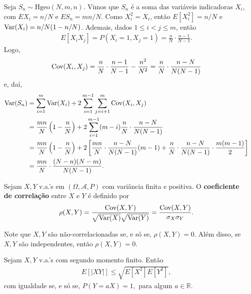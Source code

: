\documentclass[../Notas.tex]{subfiles}
\begin{document}
\begin{example}
Seja $S_n\sim\text{Hgeo}(N,m,n)$. Vimos que $S_n$ é a soma das variáveis indicadoras $X_i$, com $EX_i = n/N$ e $ES_n = mn/N$. Como $X_i^2=X_i$, então $E[X_i^2] = n/N$ e $\text{Var}(X_i) = n/N(1 - n/N)$. Ademais, dados $1\leq i < j\leq m$, então
\begin{align*}
    E[X_iX_j] = P(X_i = 1, X_j = 1) = \frac{n}{N}\cdot\frac{n-1}{N-1}.
\end{align*}
Logo,
\begin{align*}
    \text{Cov}(X_i, X_j) = \frac{n}{N}\cdot\frac{n-1}{N-1} - \frac{n^2}{N^2} = \frac{n}{N}\cdot\frac{n-N}{N(N-1)}
\end{align*}
e, daí,
\begin{align*}
    \text{Var}(S_n) &= \sum_{i=1}^m \text{Var}(X_i) + 2\sum_{i=1}^{m-1}\sum_{j=i+1}^m \text{Cov}(X_i, X_j) \\
    &= \frac{mn}{N}\left(1 - \frac{n}{N}\right) + 2\sum_{i=1}^{m-1}(m-i)\frac{n}{N}\cdot\frac{n-N}{N(N-1)} \\
    &= \frac{mn}{N}\left(1 - \frac{n}{N}\right) + 2\left[ \frac{mn}{N}\cdot\frac{n-N}{N(N-1)}(m-1) + \frac{n}{N}\cdot\frac{n-N}{N(N-1)}\cdot\frac{m(m-1)}{2} \right] \\
    &= \frac{mn}{N}\cdot\frac{(N-n)(N-m)}{N(N-1)}.
\end{align*}
\end{example}

\begin{definition}
Sejam $X,Y$ v.a.'s em $(\Omega, \mathcal{A}, P)$ com variância finita e positiva. O \textbf{coeficiente de correlação} entre $X$ e $Y$ é definido por
\begin{align*}
    \rho(X,Y) = \frac{\text{Cov}(X,Y)}{\sqrt{\text{Var}(X)}\sqrt{\text{Var}(Y)}} = \frac{\text{Cov}(X,Y)}{\sigma_X\sigma_Y}.
\end{align*}
\end{definition}

\begin{remark}
Note que $X, Y$ são não-correlacionadas se, e só se, $\rho(X,Y) = 0$. Além disso, se $X,Y$ são independentes, então $\rho(X,Y) = 0$.
\end{remark}

\begin{theorem}
Sejam $X,Y$ v.a.'s com segundo momento finito. Então
\begin{align*}
    E[|XY|] \leq \sqrt{E[X^2]E[Y^2]},
\end{align*}
com igualdade se, e só se, $P(Y=aX) = 1,$ para algum $a\in\mathbb{R}$.
\end{theorem}
\end{document}
